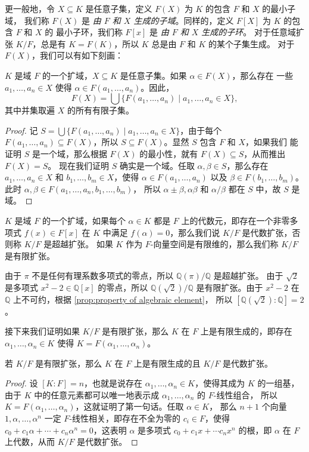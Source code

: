 更一般地，令 $X\subseteq K$ 是任意子集，定义 $F(X)$ 为 $K$ 的包含 $F$ 和 $X$ 的最小子域，
我们称 $F(X)$ 是 \emph{由 $F$ 和 $X$ 生成的子域}。同样的，定义 $F[X]$ 为 $K$ 的包含 $F$ 和 $X$ 的
最小子环，我们称 $F[x]$ 是 \emph{由 $F$ 和 $X$ 生成的子环}。
对于任意域扩张 $K/F$，总是有 $K=F(K)$，所以 $K$ 总是由 $F$ 和 $K$ 的某个子集生成。
对于 $F(X)$，我们可以有如下刻画：
\begin{proposition}\label{prop:generated by set}
  $K$ 是域 $F$ 的一个扩域，$X\subseteq K$ 是任意子集。如果 $\alpha\in F(X)$，那么存在
  一些 $a_1,\dots,a_n\in X$ 使得 $\alpha\in F(a_1,\dots,a_n)$。因此，
  \[
    F(X)=\bigcup \bigl\{F(a_1,\dots,a_n)\mid a_1,\dots,a_n\in X\bigr\}  ,
  \]
  其中并集取遍 $X$ 的所有有限子集。
\end{proposition}
\begin{proof}
  记 $S=\bigcup \bigl\{F(a_1,\dots,a_n)\mid a_1,\dots,a_n\in X\bigr\}$，由于每个
  $F(a_1,\dots,a_n)\subseteq F(X)$，所以 $S\subseteq F(X)$。显然 $S$ 包含 $F$ 和 $X$，如果我们
  能证明 $S$ 是一个域，那么根据 $F(X)$ 的最小性，就有 $F(X)\subseteq S$，从而推出 $F(X)=S$。
  现在我们证明 $S$ 确实是一个域。任取 $\alpha,\beta\in S$，那么存在
  $a_1,\dots,a_n\in X$ 和 $b_1,\dots,b_m\in X$，使得 $\alpha\in F(a_1,\dots,a_n)$ 以及 
  $\beta\in F(b_1,\dots,b_m)$。此时 $\alpha,\beta\in F(a_1,\dots,a_n,b_1,\dots,b_m)$，
  所以 $\alpha\pm \beta,\alpha\beta$ 和 $\alpha/\beta$ 都在 $S$ 中，故 $S$
  是域。
\end{proof}

\begin{definition}
  $K$ 是域 $F$ 的一个扩域，如果每个 $\alpha\in K$ 都是 $F$ 上的代数元，即存在一个非零多项式
  $f(x)\in F[x]$ 在 $K$ 中满足 $f(\alpha)=0$，那么我们说 $K/F$ 是代数扩张，否则称
  $K/F$ 是超越扩张。
  如果 $K$ 作为 $F$-向量空间是有限维的，那么我们称 $K/F$ 是有限扩张。
\end{definition}

由于 $\pi$ 不是任何有理系数多项式的零点，所以 $\mathbb{Q}(\pi)/\mathbb{Q}$ 是超越扩张。
由于 $\sqrt{2}$ 是多项式 $x^2-2\in\mathbb{Q}[x]$ 的零点，所以 $\mathbb{Q}(\sqrt{2})/\mathbb{Q}$
是有限扩张。由于 $x^2-2$ 在 $\mathbb{Q}$ 上不可约，根据 \autoref{prop:property of algebraic element}，
所以 $[\mathbb{Q}(\sqrt{2}):\mathbb{Q}]=2$。

接下来我们证明如果 $K/F$ 是有限扩张，那么 $K$ 在 $F$ 上是有限生成的，即存在 $\alpha_1,\dots,\alpha_n\in K$
使得 $K=F(\alpha_1,\dots,\alpha_n)$。

\begin{proposition}
  若 $K/F$ 是有限扩张，那么 $K$ 在 $F$ 上是有限生成的且 $K/F$ 是代数扩张。
\end{proposition}
\begin{proof}
  设 $[K:F]=n$，也就是说存在 $\alpha_1,\dots,\alpha_n\in K$，使得其成为 $K$ 的一组基，由于
  $K$ 中的任意元素都可以唯一地表示成 $\alpha_1,\dots,\alpha_n$ 的 $F$-线性组合，
  所以 $K=F(\alpha_1,\dots,\alpha_n)$，这就证明了第一句话。任取 $\alpha\in K$，
  那么 $n+1$ 个向量 $1,\alpha,\dots,\alpha^n$ 一定 $F$-线性相关，即存在不全为零的
  $c_i\in F$，使得 $c_0+c_1\alpha+\cdots+c_n\alpha^n=0$，这表明 $\alpha$
  是多项式 $c_0+c_1x+\cdots c_nx^n$ 的根，即 $\alpha$ 在 $F$ 上代数，从而 $K/F$
  是代数扩张。
\end{proof}

